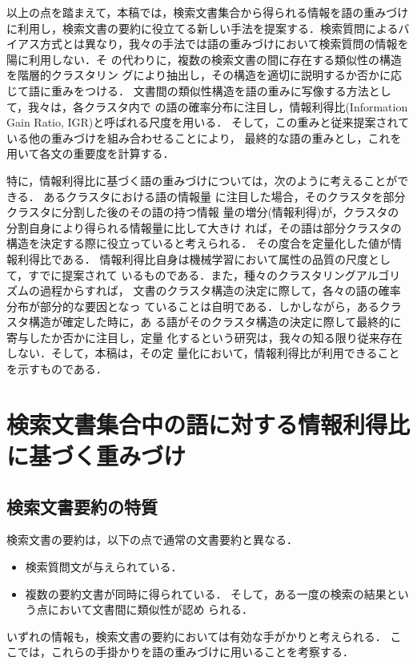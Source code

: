 以上の点を踏まえて，本稿では，検索文書集合から得られる情報を語の重みづけ
に利用し，検索文書の要約に役立てる新しい手法を提案する．検索質問によるバ
イアス方式とは異なり，我々の手法では語の重みづけにおいて検索質問の情報を陽に利用しない．そ
の代わりに，複数の検索文書の間に存在する類似性の構造を階層的クラスタリン
グにより抽出し，その構造を適切に説明するか否かに応じて語に重みをつける．
文書間の類似性構造を語の重みに写像する方法として，我々は，各クラスタ内で
の語の確率分布に注目し，情報利得比(Information Gain Ratio,
IGR)\cite{C4.5-E}と呼ばれる尺度を用いる．
そして，この重みと従来提案されている他の重みづけを組み合わせることにより，
最終的な語の重みとし，これを用いて各文の重要度を計算する．

特に，情報利得比に基づく語の重みづけについては，次のように考えることができる．
あるクラスタにおける語の情報量
に注目した場合，そのクラスタを部分クラスタに分割した後のその語の持つ情報
量の増分(情報利得)が，クラスタの分割自身により得られる情報量に比して大きけ
れば，その語は部分クラスタの構造を決定する際に役立っていると考えられる．
その度合を定量化した値が情報利得比である．
情報利得比自身は機械学習において属性の品質の尺度として，すでに提案されて
いるものである．また，種々のクラスタリングアルゴリズムの過程からすれば，
文書のクラスタ構造の決定に際して，各々の語の確率分布が部分的な要因となっ
ていることは自明である．しかしながら，あるクラスタ構造が確定した時に，あ
る語がそのクラスタ構造の決定に際して最終的に寄与したか否かに注目し，定量
化するという研究は，我々の知る限り従来存在しない．そして，本稿は，その定
量化において，情報利得比が利用できることを示すものである．


\section{検索文書集合中の語に対する情報利得比に基づく重みづけ}
  \label{Sec:検索文書集合中の語に対する情報利得比に基づく重みづけ}

\subsection{検索文書要約の特質}
  \label{Sec:検索文書要約の特質}

検索文書の要約は，以下の点で通常の文書要約と異なる．
\begin{itemize}
 \item 検索質問文が与えられている．
 \item 複数の要約文書が同時に得られている．
       そして，ある一度の検索の結果という点において文書間に類似性が認め
       られる．
\end{itemize}
いずれの情報も，検索文書の要約においては有効な手がかりと考えられる．
ここでは，これらの手掛かりを語の重みづけに用いることを考察する．

